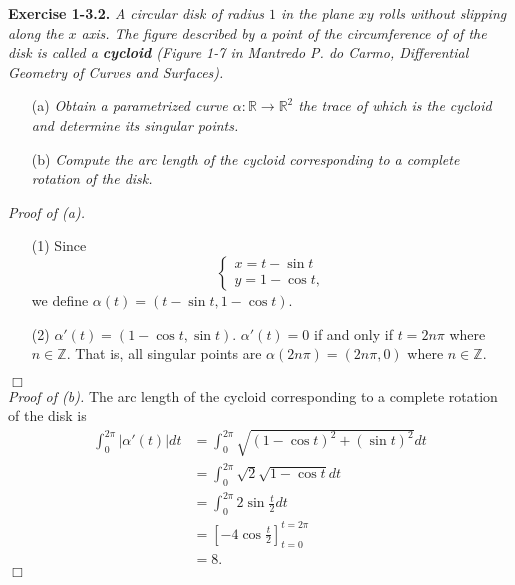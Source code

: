 \documentclass{article}
\begin{document}



\textbf{Exercise 1-3.2.}
\emph{A circular disk of radius $1$ in the plane $xy$ rolls without slipping
along the $x$ axis.
The figure described by a point of the circumference of of the disk is
called a \textbf{cycloid}
(Figure 1-7 in Mantredo P. do Carmo, Differential Geometry of Curves and Surfaces).}
\begin{enumerate}
  \item[(a)]
  \emph{Obtain a parametrized curve $\alpha: \mathbb{R} \to \mathbb{R}^2$
  the trace of which is the cycloid and determine its singular points.}
  \item[(b)]
  \emph{Compute the arc length of the cycloid
  corresponding to a complete rotation of the disk.} \\
\end{enumerate}

\emph{Proof of (a).}
\begin{enumerate}
\item[(1)]
Since
\begin{equation*}
  \begin{cases}
     x = t - \sin t \\
     y = 1 - \cos t,
  \end{cases}
\end{equation*}
we define $\alpha(t) = (t - \sin t, 1 - \cos t)$.
\item[(2)]
$\alpha'(t) = (1 - \cos t, \sin t)$.
$\alpha'(t) = 0$ if and only if $t = 2n\pi$ where $n \in \mathbb{Z}$.
That is, all singular points are $\alpha(2n\pi) = (2n\pi, 0)$ where $n \in \mathbb{Z}$.
\end{enumerate}
$\Box$ \\

\emph{Proof of (b).}
The arc length of the cycloid corresponding to a complete rotation of the disk is
\begin{align*}
\int_{0}^{2\pi} |\alpha'(t)| dt
&= \int_{0}^{2\pi} \sqrt{(1-\cos t)^2 + (\sin t)^2} dt \\
&= \int_{0}^{2\pi} \sqrt{2} \sqrt{1 - \cos t} dt \\
&= \int_{0}^{2\pi} 2 \sin \frac{t}{2} dt \\
&= \left[ -4 \cos\frac{t}{2} \right]_{t=0}^{t=2\pi} \\
&= 8.
\end{align*}
$\Box$ \\
\end{document}
